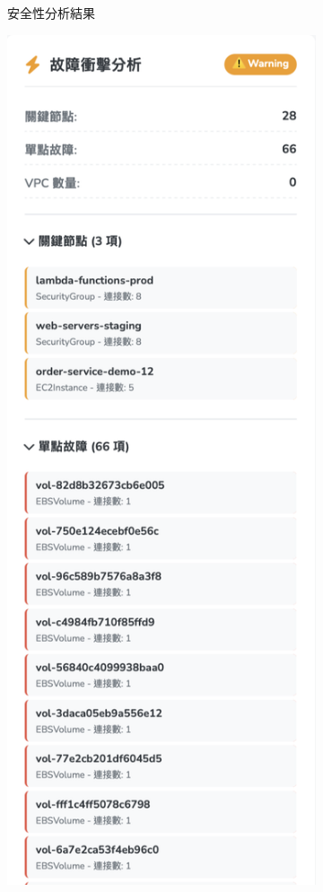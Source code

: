 \documentclass[11pt,a4paper]{ctexart}
\begin{document}
\begin{figure}[H]
\begin{subfigure}[b]{0.32\textwidth}
\caption{安全性分析結果}
\label{fig:security}
\end{subfigure}
\hfill
\begin{subfigure}[b]{0.32\textwidth}
\centering
\includegraphics[width=\textwidth]{故障衝擊分析.png}

\end{subfigure}
\end{figure}
\end{document}
